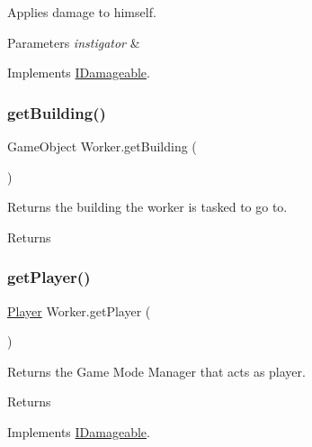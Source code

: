Applies damage to himself. 


\begin{DoxyParams}{Parameters}
{\em instigator} & \\
\hline
\end{DoxyParams}


Implements \mbox{\hyperlink{interface_i_damageable}{I\+Damageable}}.

\mbox{\label{class_worker_a02dbad705674cab848e27a8900711fa0}} 
\subsubsection{\texorpdfstring{get\+Building()}{getBuilding()}}
{\footnotesize\ttfamily Game\+Object Worker.\+get\+Building (\begin{DoxyParamCaption}{ }\end{DoxyParamCaption})}



Returns the building the worker is tasked to go to. 

\begin{DoxyReturn}{Returns}

\end{DoxyReturn}
\mbox{\label{class_worker_a5e30c24482b9784f59623e8443e46827}} 
\subsubsection{\texorpdfstring{get\+Player()}{getPlayer()}}
{\footnotesize\ttfamily \mbox{\hyperlink{class_player}{Player}} Worker.\+get\+Player (\begin{DoxyParamCaption}{ }\end{DoxyParamCaption})}



Returns the Game Mode Manager that acts as player. 

\begin{DoxyReturn}{Returns}

\end{DoxyReturn}


Implements \mbox{\hyperlink{interface_i_damageable}{I\+Damageable}}.

\mbox{\label{class_worker_a7a73629546f14e99a70363e5f7049092}} 

